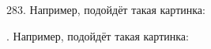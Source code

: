283. Например, подойдёт такая картинка:
\begin{center}
\begin{figure}[ht!]
\end{figure}
\end{center}\newpage
{}. Например, подойдёт такая картинка:
\begin{center}
\begin{figure}[ht!]
\end{figure}
\end{center}
